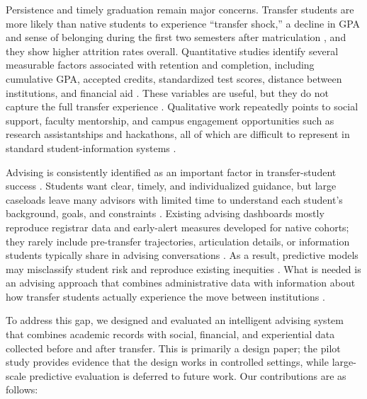 \documentclass[letterpaper,11pt]{article}
\begin{document}
Persistence and timely graduation remain major concerns. Transfer students are more likely than native students to experience ``transfer shock,'' a decline in GPA and sense of belonging during the first two semesters after matriculation \parencite{jaggars2025}, and they show higher attrition rates overall. Quantitative studies identify several measurable factors associated with retention and completion, including cumulative GPA, accepted credits, standardized test scores, distance between institutions, and financial aid \parencite{jaggars2025,roksa2008credits,factoranalysis2023}. These variables are useful, but they do not capture the full transfer experience \parencite{nguyen2025school}. Qualitative work repeatedly points to social support, faculty mentorship, and campus engagement opportunities such as research assistantships and hackathons, all of which are difficult to represent in standard student-information systems \parencite{thiry2023}.

Advising is consistently identified as an important factor in transfer-student success \parencite{thiry2023,lukszo2020}. Students want clear, timely, and individualized guidance, but large caseloads leave many advisors with limited time to understand each student's background, goals, and constraints \parencite{preposttransfer2014,nguyen2025school}. Existing advising dashboards mostly reproduce registrar data and early-alert measures developed for native cohorts; they rarely include pre-transfer trajectories, articulation details, or information students typically share in advising conversations \parencite{nguyen2024community,nguyen2025school}. As a result, predictive models may misclassify student risk and reproduce existing inequities \parencite{computingtransfer2024,socialcognitive2022}. What is needed is an advising approach that combines administrative data with information about how transfer students actually experience the move between institutions \parencite{nguyen2025school}.

To address this gap, we designed and evaluated an intelligent advising system that combines academic records with social, financial, and experiential data collected before and after transfer. This is primarily a design paper; the pilot study provides evidence that the design works in controlled settings, while large-scale predictive evaluation is deferred to future work. Our contributions are as follows:
\end{document}

